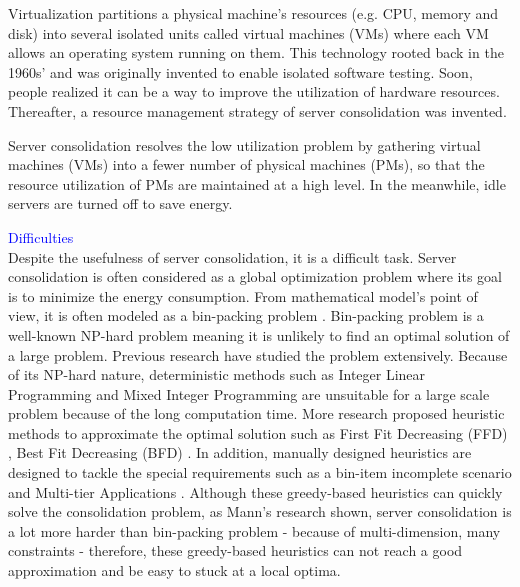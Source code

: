 Virtualization \cite{Uhlig:2005do} partitions a physical machine's resources (e.g. CPU, memory and disk) into several isolated units called virtual machines (VMs) where each VM allows an operating system running on them. This technology rooted back in the 1960s' and was originally invented to enable isolated software testing. Soon, people realized it can be a way to improve the utilization of hardware resources. Thereafter, a resource management strategy of server consolidation was invented.

Server consolidation \cite{Zhang:2010vo} resolves the low utilization problem by gathering virtual machines (VMs) into a fewer number of physical machines (PMs), so that the resource utilization of PMs are maintained at a high level.  
In the meanwhile, idle servers are turned off to save energy.

\textcolor{Blue}{Difficulties}\\
Despite the usefulness of server consolidation, it is a difficult task. 
Server consolidation is often considered as a global optimization problem 
where its goal is to minimize the energy consumption. 
From mathematical model's point of view, it is often modeled as a bin-packing problem \cite{Mann:2015ua}.
Bin-packing problem is a well-known NP-hard problem meaning it is unlikely to find an optimal solution 
of a large problem. Previous research have studied the problem extensively. 
Because of its NP-hard nature, deterministic methods such as  
Integer Linear Programming \cite{Speitkamp:2010ck} and Mixed
Integer Programming \cite{Wang:2016eh} are unsuitable for a large scale problem 
because of the long computation time.  More research proposed heuristic methods
 to approximate the optimal solution such as 
First Fit Decreasing (FFD) \cite{Panigrahy:2011wk}, Best Fit Decreasing (BFD) \cite{Xu:2010vh}.
In addition, manually designed heuristics are designed to tackle the special requirements such 
as a bin-item incomplete scenario \cite{Gupta:2008ul} and Multi-tier Applications \cite{Jung:2008vb, Li:2009wf}. Although these greedy-based heuristics can quickly solve the consolidation problem,  as Mann's research \cite{Mann:2015ua} shown, 
server consolidation is a lot more harder than bin-packing problem - because of multi-dimension, many constraints - 
therefore, these greedy-based heuristics can not reach a good approximation and be easy to 
stuck at a local optima.

